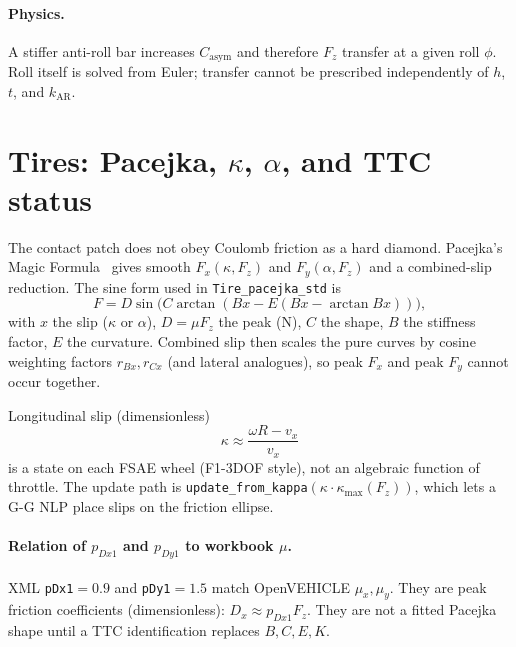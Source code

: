\documentclass[11pt,letterpaper]{article}
\newcommand{\eng}[1]{\paragraph{Physics.} #1}
\begin{document}
\eng{A stiffer anti-roll bar increases $C_{\mathrm{asym}}$ and therefore
$F_z$ transfer at a given roll $\phi$. Roll itself is solved from
Euler; transfer cannot be prescribed independently of $h$, $t$, and
$k_{\mathrm{AR}}$.}

\section{Tires: Pacejka, $\kappa$, $\alpha$, and TTC status}
\label{sec:tires}

The contact patch does not obey Coulomb friction as a hard diamond.
Pacejka's Magic Formula~\cite{pacejka} gives smooth $F_x(\kappa,F_z)$
and $F_y(\alpha,F_z)$ and a combined-slip reduction. The sine form used
in \texttt{Tire\_pacejka\_std} is
\begin{equation}
  F = D\sin\bigl(C\arctan(B x - E(B x - \arctan B x))\bigr),
\end{equation}
with $x$ the slip ($\kappa$ or $\alpha$), $D=\mu F_z$ the peak
(\si{\newton}), $C$ the shape, $B$ the stiffness factor, $E$ the
curvature. Combined slip then scales the pure curves by cosine
weighting factors $r_{Bx},r_{Cx}$ (and lateral analogues), so peak
$F_x$ and peak $F_y$ cannot occur together.

Longitudinal slip (dimensionless)
\begin{equation}
  \kappa \approx \frac{\omega R - v_x}{v_x}
\end{equation}
is a state on each FSAE wheel (F1-3DOF style), not an algebraic
function of throttle. The update path is
\texttt{update\_from\_kappa}$(\kappa\cdot\kappa_{\max}(F_z))$, which
lets a G-G NLP place slips on the friction ellipse.

\paragraph{Relation of $p_{Dx1}$ and $p_{Dy1}$ to workbook $\mu$.}
XML \texttt{pDx1}$=0.9$ and \texttt{pDy1}$=1.5$ match OpenVEHICLE
$\mu_x,\mu_y$. They are peak friction coefficients (dimensionless):
$D_x \approx p_{Dx1} F_z$. They are not a fitted Pacejka shape until a
TTC identification replaces $B,C,E,K$.
\end{document}
